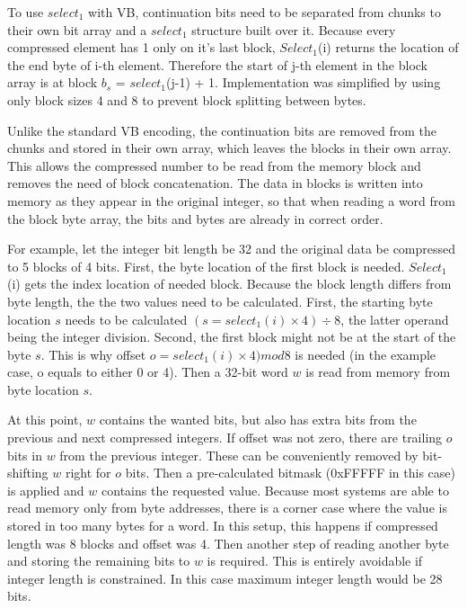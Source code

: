 To use $select_1$ with VB, continuation bits need to be separated from chunks to their own bit array and a $select_1$ structure built over it. Because every compressed element has 1
only on it's last block, $Select_1$(i) returns the location of the end byte of i-th element. Therefore the start of j-th element in the block array is at 
block $b_s$ = $select_1$(j-1) + 1. Implementation was simplified by using only block sizes 4 and 8 to prevent block splitting between bytes.

Unlike the standard VB encoding, the continuation bits are removed from the chunks and stored in their own array, which leaves the blocks in their own array. This allows the 
compressed number to be read from the memory block and removes the need of block concatenation. The data in blocks is written into memory as they appear in the original integer, so that 
when reading a word from the block byte array, the bits and bytes are already in correct order. 

For example, let the integer bit length be 32 and the original data be compressed to 5 blocks of 4 bits. First, the byte location of the first block is needed. $Select_1$(i) gets the index location
of needed block. Because the block length differs from byte length, the the two values need to be calculated. First, the starting byte location $s$ needs to be calculated 
$(s = select_1(i) \times 4) \div 8$, the latter operand being the integer division. Second, the first block might not be at the start of the byte $s$. This is why offset $o = select_1(i) \times 4) mod 8$
is needed (in the example case, o equals to either 0 or 4). Then a 32-bit word $w$ is read from memory from byte location $s$. 

At this point, $w$ contains the wanted bits, but also has extra bits from the previous and next compressed integers. If offset was not zero, there are trailing $o$ bits in $w$ from the previous integer. 
These can be conveniently removed by bit-shifting $w$ right for $o$ bits. Then a pre-calculated bitmask (0xFFFFF in this case) is applied and $w$ contains the requested value. Because most systems are
able to read memory only from byte addresses, there is a corner case where the value is stored in too many bytes for a word. In this setup, this happens if compressed length was 8 blocks and offset was 4.
Then another step of reading another byte and storing the remaining bits to $w$ is required. This is entirely avoidable if integer length is constrained. In this case maximum integer length would be 28 bits.

